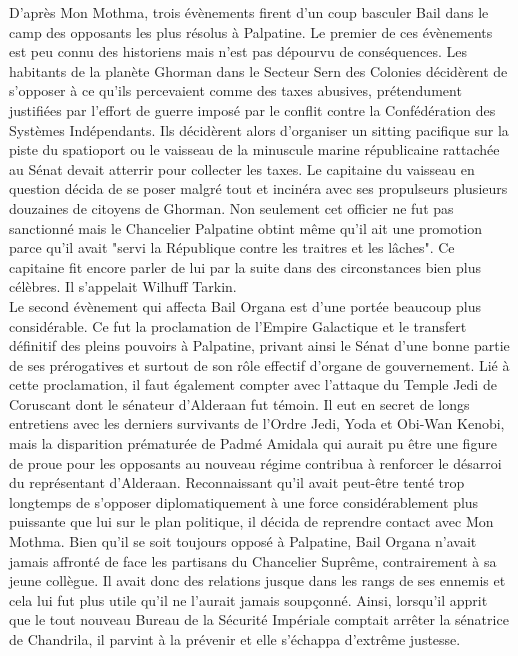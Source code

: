 \documentclass[twoside]{article}
\begin{document}
D'après Mon Mothma, trois évènements firent d'un coup basculer Bail dans le camp des opposants les plus résolus à Palpatine. Le premier de ces évènements est peu connu des historiens mais n'est pas dépourvu de conséquences. Les habitants de la planète Ghorman dans le Secteur Sern des Colonies décidèrent de s'opposer à ce qu'ils percevaient comme des taxes abusives, prétendument justifiées par l'effort de guerre imposé par le conflit contre la Confédération des Systèmes Indépendants. Ils décidèrent alors d'organiser un sitting pacifique sur la piste du spatioport ou le vaisseau de la minuscule marine républicaine rattachée au Sénat devait atterrir pour collecter les taxes. Le capitaine du vaisseau en question décida de se poser malgré tout et incinéra avec ses propulseurs plusieurs douzaines de citoyens de Ghorman. Non seulement cet officier ne fut pas sanctionné mais le Chancelier Palpatine obtint même qu'il ait une promotion parce qu'il avait "servi la République contre les traitres et les lâches". Ce capitaine fit encore parler de lui par la suite dans des circonstances bien plus célèbres. Il s'appelait Wilhuff Tarkin.\\

Le second évènement qui affecta Bail Organa est d'une portée beaucoup plus considérable. Ce fut la proclamation de l'Empire Galactique et le transfert définitif des pleins pouvoirs à Palpatine, privant ainsi le Sénat d'une bonne partie de ses prérogatives et surtout de son rôle effectif d'organe de gouvernement. Lié à cette proclamation, il faut également compter avec l'attaque du Temple Jedi de Coruscant dont le sénateur d'Alderaan fut témoin. Il eut en secret de longs entretiens avec les derniers survivants de l'Ordre Jedi, Yoda et Obi-Wan Kenobi, mais la disparition prématurée de Padmé Amidala qui aurait pu être une figure de proue pour les opposants au nouveau régime contribua à renforcer le désarroi du représentant d'Alderaan. Reconnaissant qu'il avait peut-être tenté trop longtemps de s'opposer diplomatiquement à une force considérablement plus puissante que lui sur le plan politique, il décida de reprendre contact avec Mon Mothma. Bien qu'il se soit toujours opposé à Palpatine, Bail Organa n'avait jamais affronté de face les partisans du Chancelier Suprême, contrairement à sa jeune collègue. Il avait donc des relations jusque dans les rangs de ses ennemis et cela lui fut plus utile qu'il ne l'aurait jamais soupçonné. Ainsi, lorsqu'il apprit que le tout nouveau Bureau de la Sécurité Impériale comptait arrêter la sénatrice de Chandrila, il parvint à la prévenir et elle s'échappa d'extrême justesse.\\
\end{document}
